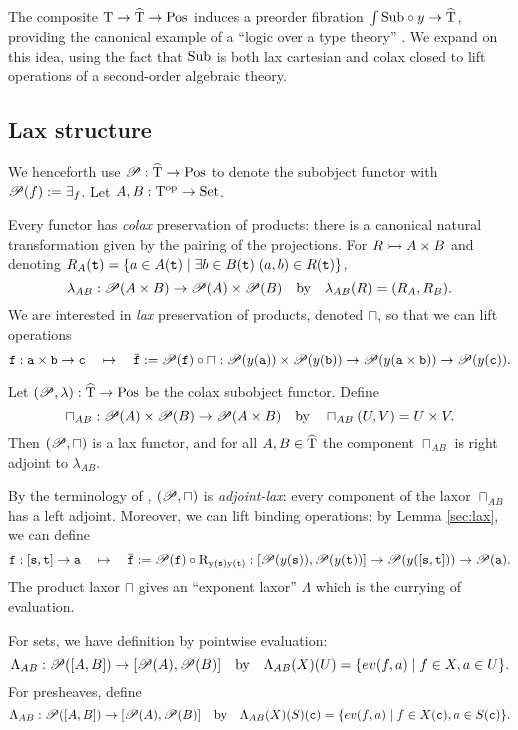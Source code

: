 \documentclass[stthol.tex]{subfiles}
\begin{document}
The composite $\mathrm{T}\to \widehat{\mathrm{T}}\to \mathrm{Pos}$ induces a preorder fibration $\int\mathrm{Sub}\circ y\to \widehat{\mathrm{T}}$, providing the canonical example of a ``logic over a type theory'' \cite{jacobs}. We expand on this idea, using the fact that $\mathrm{Sub}$ is both lax cartesian and colax closed to lift operations of a second-order algebraic theory.

\subsection{Lax structure}
\label{ssec:lax}
We henceforth use $\mathscr{P}:\widehat{\mathrm{T}}\to \mathrm{Pos}$ to denote the subobject functor with $\mathscr{P}(f):=\exists_f$. Let $A,B:\mathrm{T}^{\mathrm{op}}\to \mathrm{Set}$.

Every functor has \textit{colax} preservation of products: there is a canonical natural transformation given by the pairing of the projections. For $R\rightarrowtail A\times B$ and denoting $R_A(\mathtt{t}) = \{a\in A(\mathtt{t})\; |\; \exists b\in B(\mathtt{t})\; (a,b)\in R(\mathtt{t})\}$,
$$\lambda_{AB}:\mathscr{P}(A\times B)\to \mathscr{P}(A)\times \mathscr{P}(B)\quad \text{by}\quad \lambda_{AB}(R)=(R_A,R_B).$$
We are interested in \textit{lax} preservation of products, denoted $\sqcap$, so that we can lift operations
$$\ttf:\tta\times \ttb\to \ttc\quad \mapsto \quad\ob{\ttf}:= \pow(\ttf)\circ \sqcap:\pow(y(\tta))\times \pow(y(\ttb))\to \pow(y(\tta\times \ttb)) \to \pow(y(\ttc)).$$

\begin{lemma}
  Let $(\mathscr{P},\lambda):\widehat{\mathrm{T}}\to \mathrm{Pos}$ be the colax subobject functor. Define
  $$\sqcap_{AB}:\mathscr{P}(A)\times\mathscr{P}(B)\to \mathscr{P}(A\times B)\quad \text{by} \quad \sqcap_{AB}(U,V) = U\times V.$$ Then $(\mathscr{P},\sqcap)$ is a lax functor, and for all $A,B\in \widehat{\mathrm{T}}$ the component $\sqcap_{AB}$ is right adjoint to $\lambda_{AB}$.
\end{lemma}

By the terminology of \cite{graphreg}, $(\mathscr{P},\sqcap)$ is \textit{adjoint-lax}: every component of the laxor $\sqcap_{AB}$ has a left adjoint. Moreover, we can lift binding operations: by Lemma \ref{sec:lax}, we can define
$$\ttf:[\tts,\ttt]\to \tta\quad \mapsto \quad\ob{\ttf}:= \pow(\ttf)\circ \mrm{R_{y(\tts)y(\ttt)}}:[\pow(y(\tts)),\pow(y(\ttt))]\to \pow(y([\tts,\ttt])) \to \pow(\tta).$$
The product laxor $\sqcap$ gives an ``exponent laxor'' $\Lambda$ which is the currying of evaluation.

For sets, we have definition by pointwise evaluation:
$$\Lambda_{AB}:\mathscr{P}([A,B])\to [\mathscr{P}(A),\mathscr{P}(B)]\quad \text{by} \quad \Lambda_{AB}(X)(U) = \{ev(f,a)\; |\; f\in X, a\in U\}.$$
For presheaves, define
$$\Lambda_{AB}:\mathscr{P}([A,B])\to [\mathscr{P}(A),\mathscr{P}(B)]\quad \text{by} \quad \Lambda_{AB}(X)(S)(\mathtt{c}) = \{ev(f,a)\; |\; f\in X(\mathtt{c}), a\in S(\mathtt{c})\}.$$
\end{document}
